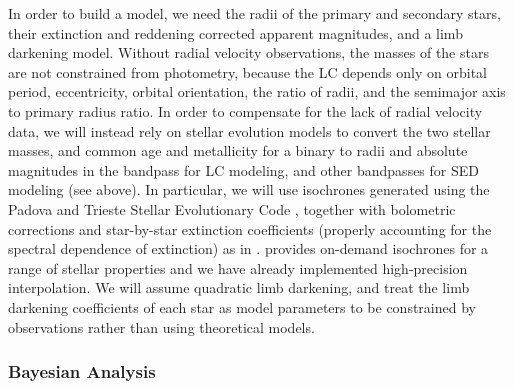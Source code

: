 In order to build a model, we need the radii of the primary and secondary stars,
their extinction and reddening corrected apparent magnitudes, and a limb
darkening model. Without radial velocity observations, the masses of the stars
are not constrained from photometry, because the LC depends only on orbital
period, eccentricity, orbital orientation, the ratio of radii, and the semimajor
axis to primary radius ratio. In order to compensate for the lack of radial
velocity data, we will instead rely on stellar evolution models to convert the
two stellar masses, and common age and metallicity for a binary to radii and
absolute magnitudes in the \tess{} bandpass for LC modeling, and other
bandpasses for SED modeling (see above). In particular, we will use isochrones
generated using the Padova and Trieste Stellar Evolutionary Code
\citep{Bressan_et_al_12, Chen_et_al_14, Chen_et_al_15, Tang_et_al_14,
Marigo_et_al_17, Pastorelli_et_al_19, Pastorelli_et_al_20}, together with
bolometric corrections and star-by-star extinction coefficients (properly
accounting for the spectral dependence of extinction) as in
\citep{Chen_et_al_19}. \citep{CMD_interface} provides on-demand isochrones for a
range of stellar properties and we have already implemented high-precision
interpolation. We will assume quadratic limb darkening, and treat the limb
darkening coefficients of each star as model parameters to be constrained by
observations rather than using theoretical models.

\subsubsection{Bayesian Analysis}
%
\label{sec:params_bayesian_analysis}

